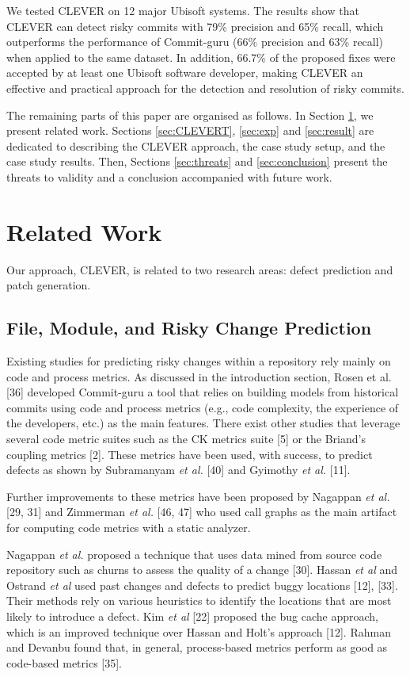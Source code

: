 \documentclass[sigconf]{acmart}
\begin{document}
We tested CLEVER on 12 major Ubisoft systems. The results show that
CLEVER can detect risky commits with 79\% precision and 65\% recall,
which outperforms the performance of Commit-guru (66\% precision and
63\% recall) when applied to the same dataset. In addition, 66.7\% of
the proposed fixes were accepted by at least one Ubisoft software
developer, making CLEVER an effective and practical approach for the
detection and resolution of risky commits.

The remaining parts of this paper are organised as follows. In Section
\ref{sec:relwork}, we present related work. Sections \ref{sec:CLEVERT},
\ref{sec:exp} and \ref{sec:result} are dedicated to describing the
CLEVER approach, the case study setup, and the case study results. Then,
Sections \ref{sec:threats} and \ref{sec:conclusion} present the threats
to validity and a conclusion accompanied with future work.

\section{Related Work}\label{sec:relwork}

Our approach, CLEVER, is related to two research areas: defect
prediction and patch generation.

\subsection{File, Module, and Risky Change
Prediction}\label{file-module-and-risky-change-prediction}

Existing studies for predicting risky changes within a repository rely
mainly on code and process metrics. As discussed in the introduction
section, Rosen et al. [36] developed Commit-guru a tool that relies
on building models from historical commits using code and process
metrics (e.g., code complexity, the experience of the developers, etc.)
as the main features. There exist other studies that leverage several
code metric suites such as the CK metrics suite [5] or the Briand's
coupling metrics [2]. These metrics have been used, with success, to
predict defects as shown by Subramanyam \emph{et al.} [40] and
Gyimothy \emph{et al.} [11].

Further improvements to these metrics have been proposed by Nagappan
\emph{et al.} [29, 31] and Zimmerman \emph{et al.} [46, 47] who
used call graphs as the main artifact for computing code metrics with a
static analyzer.

Nagappan \emph{et al.} proposed a technique that uses data mined from
source code repository such as churns to assess the quality of a change
[30]. Hassan \emph{et al} and Ostrand \emph{et al} used past changes
and defects to predict buggy locations [12], [33]. Their methods
rely on various heuristics to identify the locations that are most
likely to introduce a defect. Kim \emph{et al} [22] proposed the bug
cache approach, which is an improved technique over Hassan and Holt's
approach [12]. Rahman and Devanbu found that, in general,
process-based metrics perform as good as code-based metrics [35].
\end{document}
